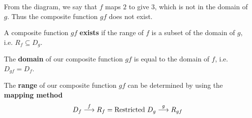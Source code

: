 \documentclass[11pt,a4paper]{book}
\begin{document}
From the diagram, we say that $f$ maps $2$ to give $3$, which is
not in the domain of $g$. Thus the composite function $gf$ does
not exist.

\begin{tcolorbox}[colback=blue!5, colframe=black,boxrule=.4pt, sharpish corners]

A composite function $gf$ \textbf{exists} if the range of $f$ is a subset of the domain of $g$, i.e. $R_{f}\subseteq D_{g}$.

The \textbf{domain} of our composite function $gf$ is equal to the domain
of $f$, i.e. $D_{gf}=D_{f}$.

The \textbf{range} of our composite function $gf$ can be determined by using
the \textbf{mapping method}
\[
D_{f}\overset{f}{\longrightarrow}R_{f}=\text{Restricted \ensuremath{D_{g}}}\overset{g}{\longrightarrow}R_{gf}
\]
\end{tcolorbox}

\newpage
\end{document}
